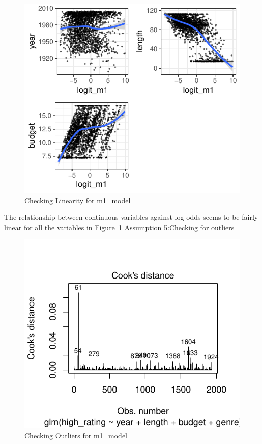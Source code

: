 \documentclass[
  letterpaper,
  DIV=11,
  numbers=noendperiod]{scrartcl}
\begin{document}
\begin{figure}

{\centering \includegraphics{Group_06_Analysis_files/figure-pdf/fig-lin-m1-1.pdf}

}

\caption{\label{fig-lin-m1}Checking Linearity for m1\_model}

\end{figure}

The relationship between continuous variables against log-odds seems to
be fairly linear for all the variables in Figure~\ref{fig-lin-m1}
\clearpage Assumption 5:Checking for outliers

\begin{figure}

{\centering \includegraphics{Group_06_Analysis_files/figure-pdf/fig-cook-m1-1.pdf}

}

\caption{\label{fig-cook-m1}Checking Outliers for m1\_model}

\end{figure}
\end{document}
